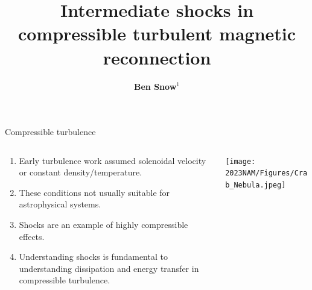 \documentclass[10pt,aspectratio=169,usenames,dvipsnames]{beamer}
\title{Intermediate shocks in compressible turbulent magnetic reconnection }
\date{}
\author{\textbf{Ben Snow$^1$}}
\institute{$^1$University of Exeter \\ NAM2023, July 2023.}
\begin{document}
\maketitle


\begin{frame}{Compressible turbulence}
\begin{columns}
\begin{column}{0.4\textwidth}
\begin{enumerate}
\item Early turbulence work assumed solenoidal velocity or constant density/temperature.
\item These conditions not usually suitable for astrophysical systems.
\item Shocks are an example of highly compressible effects.
\item Understanding shocks is fundamental to understanding dissipation and energy transfer in compressible turbulence.
\end{enumerate}
\end{column}
\begin{column}{0.6\textwidth}
\texttt{[image: 2023NAM/Figures/Crab\_Nebula.jpeg]}
\end{column}
\end{columns}
\end{frame}
\end{document}
